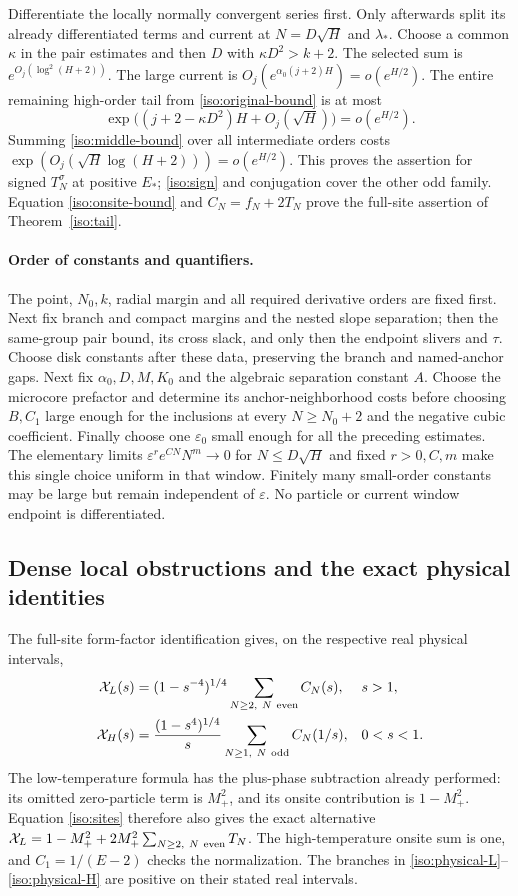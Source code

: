 \documentclass[11pt]{article}
\numberwithin{equation}{section}
\theoremstyle{definition}
\newcommand{\eps}{\varepsilon}
\begin{document}
Differentiate the locally normally convergent series first. Only
afterwards split its already differentiated terms and current at
$N=D\sqrt H$ and $\lambda_*$.
Choose a common $\kappa$ in the pair estimates and then
$D$ with $\kappa D^2>k+2$.
The selected sum is $e^{O_j(\log^2(H+2))}$.
The large current is $O_j(e^{\alpha_0(j+2)H})=o(e^{H/2})$.
The entire remaining high-order tail from \eqref{iso:original-bound}
is at most
\[
 \exp\bigl((j+2-\kappa D^2)H+O_j(\sqrt H)\bigr)=o(e^{H/2}).
\]
Summing \eqref{iso:middle-bound} over all intermediate orders costs
$\exp(O_j(\sqrt H\log(H+2)))=o(e^{H/2})$.
This proves the assertion for signed $T_N^\sigma$ at positive $E_*$;
\eqref{iso:sign} and conjugation cover the other odd family.
Equation \eqref{iso:onsite-bound} and $C_N=f_N+2T_N$ prove the
full-site assertion of Theorem~\ref{iso:tail}.

\paragraph{Order of constants and quantifiers.}
The point, $N_0,k$, radial margin and all required derivative orders are
fixed first. Next fix branch and compact margins and the nested slope
separation; then the same-group pair bound, its cross slack, and only
then the endpoint slivers and $\tau$. Choose disk constants after these
data, preserving the branch and named-anchor gaps. Next fix
$\alpha_0,D,M,K_0$ and the algebraic separation constant $A$.
Choose the microcore prefactor and determine its anchor-neighborhood
costs before choosing $B,C_1$ large enough for the inclusions at every
$N\ge N_0+2$ and the negative cubic coefficient. Finally choose one
$\eps_0$ small enough for all the preceding estimates. The elementary
limits $\eps^r e^{CN}N^m\to0$ for $N\le D\sqrt H$ and fixed
$r>0,C,m$ make this single choice uniform in that window.
Finitely many small-order constants may be large but remain independent
of $\eps$. No particle or current window endpoint is differentiated.

\subsection{Dense local obstructions and the exact physical identities}

The full-site form-factor identification gives, on the respective real
physical intervals,
\begin{align}
 \mathcal X_L(s)&=(1-s^{-4})^{1/4}
                  \sum_{N\ge2,\ N\ {\rm even}}C_N(s),
                  &&s>1,\label{iso:physical-L}\\
 \mathcal X_H(s)&=\frac{(1-s^4)^{1/4}}s
                  \sum_{N\ge1,\ N\ {\rm odd}}C_N(1/s),
                  &&0<s<1.\label{iso:physical-H}
\end{align}
The low-temperature formula has the plus-phase subtraction already
performed: its omitted zero-particle term is $M_+^2$, and its onsite
contribution is $1-M_+^2$. Equation \eqref{iso:sites} therefore also
gives the exact alternative
$\mathcal X_L=1-M_+^2+2M_+^2\sum_{N\ge2,\ N\ {\rm even}}T_N$.
The high-temperature onsite sum is one, and $C_1=1/(E-2)$ checks the
normalization. The branches in \eqref{iso:physical-L}--\eqref{iso:physical-H}
are positive on their stated real intervals.
\end{document}
